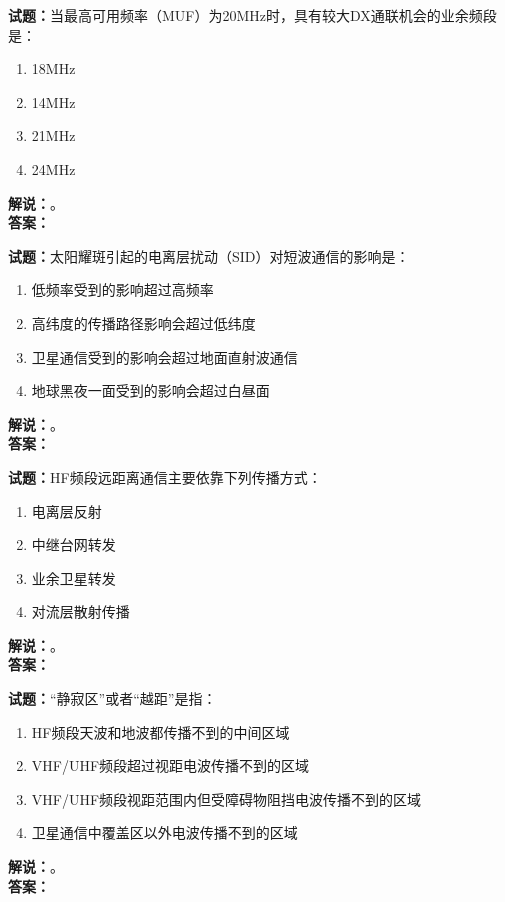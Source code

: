 \documentclass{ctexbook}
\begin{document}
\vspace{\baselineskip}

\noindent\textbf{试题：}当最高可用频率（MUF）为20\unit{\MHz}时，具有较大DX通联机会的业余频段是：
\begin{enumerate}[leftmargin=3em]
  \item 18\unit{\MHz}
  \item 14\unit{\MHz}
  \item 21\unit{\MHz}
  \item 24\unit{\MHz}
\end{enumerate}
\noindent\textbf{解说：}\textbf{}。\\\noindent\textbf{答案：}

\vspace{\baselineskip}

\noindent\textbf{试题：}太阳耀斑引起的电离层扰动（SID）对短波通信的影响是：
\begin{enumerate}[leftmargin=3em]
  \item 低频率受到的影响超过高频率
  \item 高纬度的传播路径影响会超过低纬度
  \item 卫星通信受到的影响会超过地面直射波通信
  \item 地球黑夜一面受到的影响会超过白昼面
\end{enumerate}
\noindent\textbf{解说：}\textbf{}。\\\noindent\textbf{答案：}

\vspace{\baselineskip}

\noindent\textbf{试题：}HF频段远距离通信主要依靠下列传播方式：
\begin{enumerate}[leftmargin=3em]
  \item 电离层反射
  \item 中继台网转发
  \item 业余卫星转发
  \item 对流层散射传播
\end{enumerate}
\noindent\textbf{解说：}\textbf{}。\\\noindent\textbf{答案：}

\vspace{\baselineskip}

\noindent\textbf{试题：}“静寂区”或者“越距”是指：
\begin{enumerate}[leftmargin=3em]
  \item HF频段天波和地波都传播不到的中间区域
  \item VHF/UHF频段超过视距电波传播不到的区域
  \item VHF/UHF频段视距范围内但受障碍物阻挡电波传播不到的区域
  \item 卫星通信中覆盖区以外电波传播不到的区域
\end{enumerate}
\noindent\textbf{解说：}\textbf{}。\\\noindent\textbf{答案：}
\end{document}

